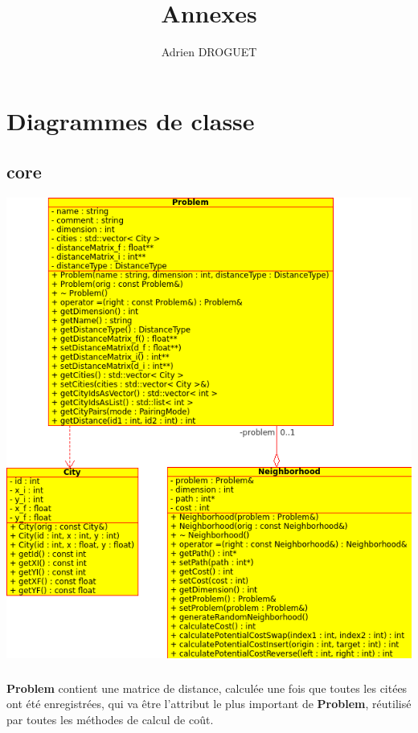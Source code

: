 \documentclass[a4paper,10pt]{report}
\title{Annexes}
\author{Adrien DROGUET}
\begin{document}
\maketitle

\tableofcontents
\pagebreak

\chapter{Diagrammes de classe}

\section{core}
\includegraphics[width=\textwidth]{../UML/core.png}

\paragraph{}
\textbf{Problem} contient une matrice de distance, calculée une fois que toutes les citées
ont été enregistrées, qui va être l'attribut le plus important de \textbf{Problem}, réutilisé
par toutes les méthodes de calcul de coût.
\end{document}

